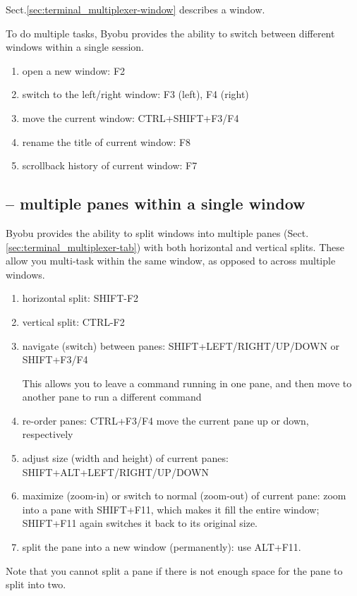 Sect.\ref{sec:terminal_multiplexer-window} describes a window. 

To do multiple tasks, Byobu provides the ability to switch between different windows within a single
session.

\begin{enumerate}
  \item open a new window: F2
  
  
  \item switch to the left/right window: F3 (left), F4 (right)
  
  \item move the current window: CTRL+SHIFT+F3/F4
  
  \item rename the title of current window: F8
  
  \item scrollback history of current window: F7
\end{enumerate}

\subsection{-- multiple panes within a single window}

Byobu provides the ability to split windows into multiple panes
(Sect.\ref{sec:terminal_multiplexer-tab}) with both horizontal and vertical
splits. These allow you multi-task within the same window, as opposed to across
multiple windows.

\begin{enumerate}
  \item horizontal split: SHIFT-F2
  
  \item vertical split: CTRL-F2
  
  \item navigate (switch) between panes: SHIFT+LEFT/RIGHT/UP/DOWN or SHIFT+F3/F4
  
  This allows you to leave a command running in one pane, and then move to another pane to run a different command
  
  \item re-order panes: CTRL+F3/F4 move the current pane up or down, respectively
  
  \item adjust size (width and height) of current panes: SHIFT+ALT+LEFT/RIGHT/UP/DOWN
  
  \item maximize (zoom-in) or switch to normal (zoom-out) of current pane:
  zoom into a pane with SHIFT+F11, which makes it fill the entire window;
  SHIFT+F11 again switches it back to its original size.
  
  \item split the pane into a new window (permanently): use ALT+F11.
  
\end{enumerate}
Note that you cannot split a pane if there is not enough space for the pane to split into two.



